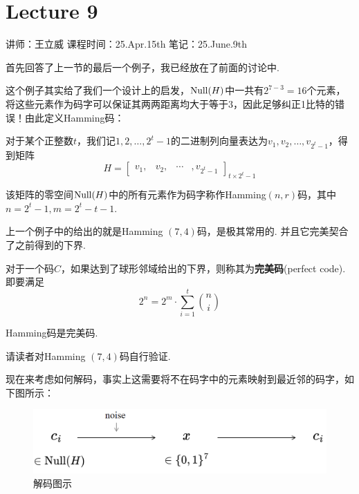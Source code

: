 \chapter{Lecture 9}

\begin{center}
    讲师：王立威 \qquad
    课程时间：25.Apr.15th \qquad 
    笔记：25.June.9th
\end{center}

\bigskip

首先回答了上一节的最后一个例子，我已经放在了前面的讨论中. 

这个例子其实给了我们一个设计上的启发，$\operatorname*{Null}(H)$中一共有$2^{7-3}=16$个元素，将这些元素作为码字可以保证其两两距离均大于等于$3$，因此足够纠正1比特的错误！由此定义Hamming码： 

\begin{definition}[Hamming $(n,m)$码]
    对于某个正整数$t$，我们记$1, 2, \dots, 2^t-1$的二进制列向量表达为$v_1, v_2, \dots, v_{2^t-1}$，得到矩阵 
    \[
H = \begin{bmatrix}
    v_1, & v_2, & \cdots & ,v_{2^t-1}
\end{bmatrix}_{t \times 2^t-1}
    \]

    该矩阵的零空间$\operatorname*{Null}(H)$中的所有元素作为码字称作Hamming$(n,r)$码，其中$n=2^t-1, m=2^t-t-1$. 
\end{definition}

上一个例子中的给出的就是Hamming $(7,4)$码，是极其常用的. 并且它完美契合了之前得到的下界.  
\begin{definition}[完美码]
    对于一个码$C$，如果达到了球形邻域给出的下界，则称其为\textbf{完美码}(perfect code). 即要满足 
    \[
        2^n = 2^m \cdot \sum_{i=1}^t \binom{n}{i}
    \]
\end{definition}
\begin{theorem}
    Hamming码是完美码.
\end{theorem}
\begin{solution}
    请读者对Hamming $(7,4)$码自行验证. 
\end{solution}

现在来考虑如何解码，事实上这需要将不在码字中的元素映射到最近邻的码字，如下图所示：
\begin{figure}[H]
    \centering
    \includegraphics[width=.8\textwidth]{images/c9_1.png}
    \caption{解码图示}
\end{figure}

